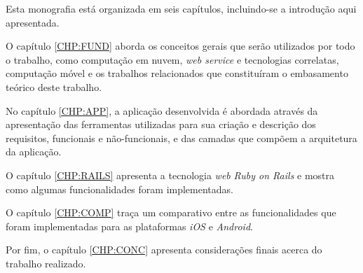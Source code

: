 Esta monografia está organizada em seis capítulos, incluindo-se a introdução aqui apresentada.

O capítulo \ref{CHP:FUND} aborda os conceitos gerais que serão utilizados por todo o trabalho, como computação em nuvem, \emph{web service} e tecnologias correlatas, computação móvel e os trabalhos  relacionados que constituíram o embasamento teórico deste trabalho.

  No capítulo \ref{CHP:APP}, a aplicação desenvolvida é abordada através da apresentação das ferramentas utilizadas para sua criação e descrição dos requisitos, funcionais e não-funcionais, e das camadas que compõem a arquitetura da aplicação.
  
O capítulo \ref{CHP:RAILS} apresenta a tecnologia \emph{web} \emph{Ruby on Rails} e mostra como algumas funcionalidades foram implementadas.

O capítulo \ref{CHP:COMP} traça um comparativo entre as funcionalidades que foram implementadas para as plataformas \emph{iOS} e \emph{Android}.



Por fim, o capítulo \ref{CHP:CONC} apresenta considerações finais acerca do trabalho realizado.
